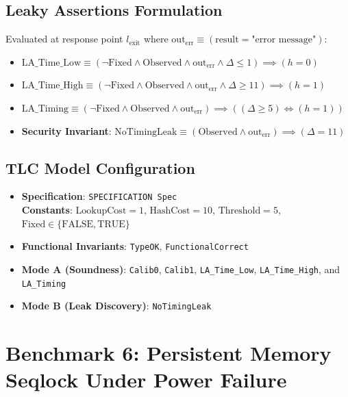 \documentclass[a4paper,12pt]{report}
\begin{document}
\subsection{Leaky Assertions Formulation}
Evaluated at response point $l_{\text{exit}}$ where $\text{out}_{\text{err}} \equiv (\text{result} = \text{"error message"})$:
\begin{itemize}[itemsep=0.08em, topsep=0.08em]
    \item $\text{LA\_Time\_Low} \equiv (\neg\text{Fixed} \land \text{Observed} \land \text{out}_{\text{err}} \land \Delta \le 1) \implies (h = 0)$
    \item $\text{LA\_Time\_High} \equiv (\neg\text{Fixed} \land \text{Observed} \land \text{out}_{\text{err}} \land \Delta \ge 11) \implies (h = 1)$
    \item $\text{LA\_Timing} \equiv (\neg\text{Fixed} \land \text{Observed} \land \text{out}_{\text{err}}) \implies ((\Delta \ge 5) \iff (h = 1))$
    \item \textbf{Security Invariant}: $\text{NoTimingLeak} \equiv (\text{Observed} \land \text{out}_{\text{err}}) \implies (\Delta = 11)$
\end{itemize}

\subsection{TLC Model Configuration}
\begin{itemize}[itemsep=0.08em, topsep=0.08em]
    \item \textbf{Specification}: \texttt{SPECIFICATION Spec} \\
    \textbf{Constants}: $\text{LookupCost} = 1$, $\text{HashCost} = 10$, $\text{Threshold} = 5$, \\
    $\text{Fixed} \in \{\text{FALSE}, \text{TRUE}\}$
    \item \textbf{Functional Invariants}: \texttt{TypeOK}, \texttt{FunctionalCorrect}
    \item \textbf{Mode A (Soundness)}: \texttt{Calib0}, \texttt{Calib1}, \texttt{LA\_Time\_Low}, \texttt{LA\_Time\_High}, and\\ \texttt{LA\_Timing}
    \item \textbf{Mode B (Leak Discovery)}: \texttt{NoTimingLeak}
\end{itemize}

\section{Benchmark 6: Persistent Memory Seqlock Under Power Failure}
\end{document}
